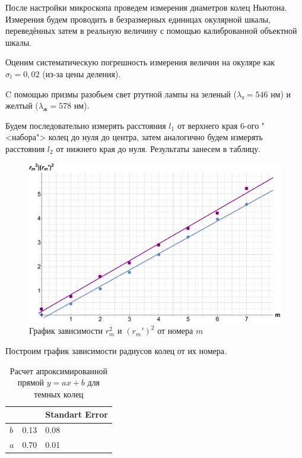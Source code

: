 \documentclass[12pt]{kiarticle}
\begin{document}
	После настройки микроскопа проведем измерения диаметров колец Ньютона. Измерения будем проводить в безразмерных единицах окулярной шкалы, переведённых затем в реальную величину с помощью калиброванной объектной шкалы. 
	
	
	Оценим систематическую погрешность измерения величин на окуляре как $ \sigma_l = 0,02 $ (из-за цены деления).
	
	C помощью призмы разобьем свет ртутной лампы на зеленый ($ \lambda_з = 546 $ нм) и желтый ($ \lambda_ж = 578  $ нм).
	
	Будем последовательно измерять расстояния $ l_1 $ от верхнего края 6-ого "<набора"> колец до нуля до центра, затем аналогично будем измерять расстояния $ l_2 $ от нижнего края до нуля. Результаты занесем в таблицу. 
	
		\begin{figure}[h!]
		\label{graf}
		\includegraphics[scale=0.47]{graf.pdf}
		\caption{График зависимости $ r_m^2$ и $ (r_m')^2 $ от номера $ m $}
	\end{figure}
	
	Построим график зависимости радиусов колец от их номера. 

	\begin{table}[h!]
		\centering
		\caption{Расчет апроксимированной прямой $ y = ax +b $ для темных колец}
		\begin{tabular}{l|ll}
				\text{} & \text{Estimate} & Standart Error  \\
				\hline
				$ b $ & 0.13 & 0.08  \\
				$ a $ & 0.70 & 0.01  \\
			\end{tabular}
	\end{table}
\end{document}
